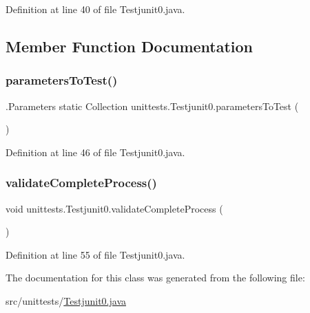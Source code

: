 Definition at line 40 of file Testjunit0.\+java.



\subsection{Member Function Documentation}
\hypertarget{classunittests_1_1_testjunit0_a0958eee4a9d97a07f0d5fded1d80551a}{}\label{classunittests_1_1_testjunit0_a0958eee4a9d97a07f0d5fded1d80551a} 
\subsubsection{\texorpdfstring{parameters\+To\+Test()}{parametersToTest()}}
{\footnotesize\ttfamily .Parameters static Collection unittests.\+Testjunit0.\+parameters\+To\+Test (\begin{DoxyParamCaption}{ }\end{DoxyParamCaption})\hspace{0.3cm}{\ttfamily [static]}}



Definition at line 46 of file Testjunit0.\+java.

\hypertarget{classunittests_1_1_testjunit0_a520f37a3bb806eb5b0aefa1d88db6d08}{}\label{classunittests_1_1_testjunit0_a520f37a3bb806eb5b0aefa1d88db6d08} 
\subsubsection{\texorpdfstring{validate\+Complete\+Process()}{validateCompleteProcess()}}
{\footnotesize\ttfamily void unittests.\+Testjunit0.\+validate\+Complete\+Process (\begin{DoxyParamCaption}{ }\end{DoxyParamCaption})}



Definition at line 55 of file Testjunit0.\+java.



The documentation for this class was generated from the following file\+:\begin{DoxyCompactItemize}
\item 
src/unittests/\hyperlink{_testjunit0_8java}{Testjunit0.\+java}\end{DoxyCompactItemize}
